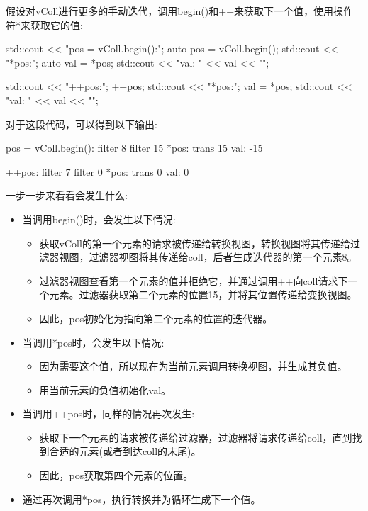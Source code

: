 假设对vColl进行更多的手动迭代，调用begin()和++来获取下一个值，使用操作符*来获取它的值:

\begin{cpp}
std::cout << "pos = vColl.begin():\n";
auto pos = vColl.begin();
std::cout << "*pos:\n";
auto val = *pos;
std::cout << "val: " << val << "\n\n";

std::cout << "++pos:\n";
++pos;
std::cout << "*pos:\n";
val = *pos;
std::cout << "val: " << val << "\n\n";
\end{cpp}

对于这段代码，可以得到以下输出:

\begin{shell}
pos = vColl.begin():
filter 8
filter 15
*pos:
trans 15
val: -15

++pos:
filter 7
filter 0
*pos:
trans 0
val: 0
\end{shell}

一步一步来看看会发生什么:

\begin{itemize}
\item
当调用begin()时，会发生以下情况:

\begin{itemize}
\item
获取vColl的第一个元素的请求被传递给转换视图，转换视图将其传递给过滤器视图，过滤器视图将其传递给coll，后者生成迭代器的第一个元素8。

\item
过滤器视图查看第一个元素的值并拒绝它，并通过调用++向coll请求下一个元素。过滤器获取第二个元素的位置15，并将其位置传递给变换视图。

\item
因此，pos初始化为指向第二个元素的位置的迭代器。
\end{itemize}

\item
当调用*pos时，会发生以下情况:

\begin{itemize}
\item
因为需要这个值，所以现在为当前元素调用转换视图，并生成其负值。

\item
用当前元素的负值初始化val。
\end{itemize}

\item
当调用++pos时，同样的情况再次发生:

\begin{itemize}
\item
获取下一个元素的请求被传递给过滤器，过滤器将请求传递给coll，直到找到合适的元素(或者到达coll的末尾)。

\item
因此，pos获取第四个元素的位置。
\end{itemize}

\item
通过再次调用*pos，执行转换并为循环生成下一个值。
\end{itemize}

